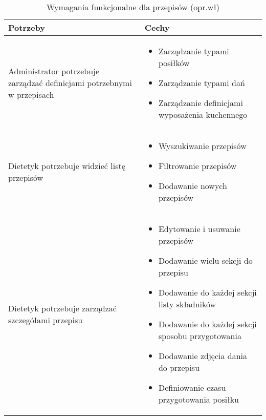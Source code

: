 \begin{minipage}{\textwidth}
    \begin{table}[H]
        \centering\caption{Wymagania funkcjonalne dla przepisów (opr.wł)\label{tabela:wymaganiaFunkcjonalnePrzepisy}}
        \begin{tabular}{|P{.3\textwidth}|P{.6\textwidth}|}
            \hline
            Potrzeby & Cechy \\

            \hline
            Administrator potrzebuje zarządzać definicjami potrzebnymi w przepisach &
            \begin{itemize}
                \item Zarządzanie typami posiłków
                \item Zarządzanie typami dań
                \item Zarządzanie definicjami wyposażenia kuchennego
            \end{itemize} \\
            \hline
            Dietetyk potrzebuje widzieć listę przepisów &
            \begin{itemize}
                \item Wyszukiwanie przepisów
                \item Filtrowanie przepisów
                \item Dodawanie nowych przepisów
            \end{itemize} \\
            \hline
            Dietetyk potrzebuje zarządzać szczegółami przepisu &
            \begin{itemize}
                \item Edytowanie i usuwanie przepisów
                \item Dodawanie wielu sekcji do przepisu
                \item Dodawanie do każdej sekcji listy składników
                \item Dodawanie do każdej sekcji sposobu przygotowania
                \item Dodawanie zdjęcia dania do przepisu
                \item Definiowanie czasu przygotowania posiłku
            \end{itemize} \\
            \hline
        \end{tabular}
    \end{table}
\end{minipage}


